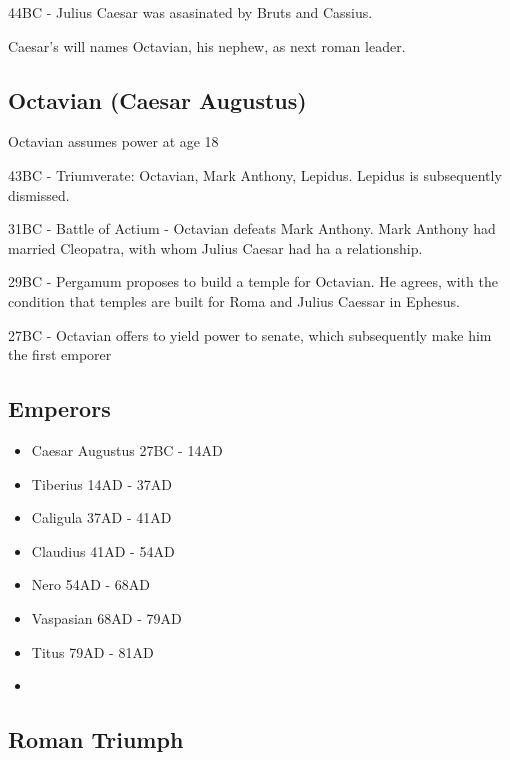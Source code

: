 \documentclass[
]{book}
\providecommand{\tightlist}{%
  \setlength{\itemsep}{0pt}\setlength{\parskip}{0pt}}
\begin{document}
44BC - Julius Caesar was asasinated by Bruts and Cassius.

Caesar's will names Octavian, his nephew, as next roman leader.

\hypertarget{octavian-caesar-augustus}{%
\subsection{Octavian (Caesar Augustus)}\label{octavian-caesar-augustus}}

Octavian assumes power at age 18

43BC - Triumverate: Octavian, Mark Anthony, Lepidus. Lepidus is subsequently dismissed.

31BC - Battle of Actium - Octavian defeats Mark Anthony. Mark Anthony had married Cleopatra, with whom Julius Caesar had ha a relationship.

29BC - Pergamum proposes to build a temple for Octavian. He agrees, with the condition that temples are built for Roma and Julius Caessar in Ephesus.

27BC - Octavian offers to yield power to senate, which subsequently make him the first emporer

\hypertarget{emperors}{%
\subsection{Emperors}\label{emperors}}

\begin{itemize}
\tightlist
\item
  Caesar Augustus 27BC - 14AD
\item
  Tiberius 14AD - 37AD
\item
  Caligula 37AD - 41AD
\item
  Claudius 41AD - 54AD
\item
  Nero 54AD - 68AD
\item
  Vaspasian 68AD - 79AD
\item
  Titus 79AD - 81AD
\item
\end{itemize}

\hypertarget{roman-triumph}{%
\subsection{Roman Triumph}\label{roman-triumph}}
\end{document}
